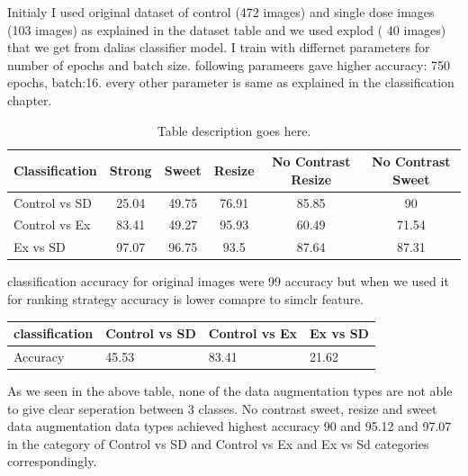 Initialy I used original dataset of control (472 images) and single dose images (103 images) as explained in the dataset table and we used explod ( 40 images) that we get from dalias classifier model.
I train with differnet parameters for  number of epochs and batch size. following parameers gave higher accuracy: 750 epochs, batch:16. every other parameter is same as explained in the classification chapter.


\begin{table}[H]
  \centering
  \begin{tabular}{@{}lccccc@{}}
  \toprule
  \textbf{Classification} & \textbf{Strong} & \textbf{Sweet} & \textbf{Resize} & \textbf{No Contrast Resize} & \textbf{No Contrast Sweet} \\ \midrule
  Control vs SD             & 25.04            & 49.75           & 76.91          & 85.85                         & 90                        \\
  Control vs Ex             & 83.41            & 49.27               & 95.93           & 60.49                          &    71.54                 \\
  Ex vs SD                & 97.07           & 96.75          & 93.5           & 87.64                       & 87.31                        \\ \bottomrule
  \end{tabular}
  \caption{Table description goes here.}
  \label{tab:ranking softmax}
\end{table}
classification accuracy for original images were 99 accuracy but when we used it for ranking strategy accuracy is lower comapre to simclr feature.
\begin{table}[H]
  \centering
  \begin{tabular}{|l|l|l|l|}
  \hline
  \multicolumn{1}{|c|}{classification} & Control vs SD & Control vs Ex & Ex vs SD \\ \hline
  Accuracy                             & 45.53             & 83.41             & 21.62        \\ \hline
  \end{tabular}
  \end{table}
As we seen in the above table, none of the  data augmentation types are not able to give clear seperation between 3 classes. No contrast sweet, resize and sweet data augmentation data types achieved highest accuracy 90 and 95.12 and 97.07  in the category of  Control vs SD and Control vs Ex and Ex vs Sd categories correspondingly. 


